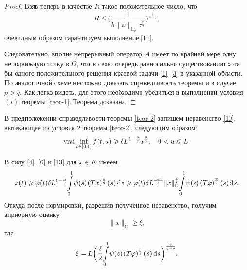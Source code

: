 \documentclass[press]{vestnik}
\begin{document}
\begin{proof}
Взяв теперь в качестве $R$ такое положительное число, что
\begin{equation}
R\leqslant \biggl(\dfrac{1}{b\|\psi\|_{\mathbb{L}_{q'}} \tau^\frac{p}{q}}\biggr)^{\frac{q}{p-q}}, \label{12}
\end{equation}
очевидным образом гарантируем выполнение \eqref{11}.

Следовательно, вполне непрерывный оператор $A$ имеет  по крайней мере одну неподвижную точку в $\Omega$, что в свою очередь равносильно существованию хотя бы одного положительного решения краевой задачи \eqref{1}--\eqref{3} в указанной области. По аналогичной схеме несложно доказать справедливость теоремы и в случае $p>q$. Как легко видеть, для этого необходимо убедиться в выполнении условия $(i)$ теоремы \ref{teor-1}. Теорема доказана.
\end{proof}

В предположении справедливости теоремы \ref{teor-2} запишем неравенство \eqref{10}, вытекающее из условия 2 теоремы \ref{teor-2}, следующим образом:
\begin{equation}
\mathop{\rm vrai}\inf_{t\in[0,1]}f(t,u)\geqslant \delta L^{1-\frac{p}{q}}u^\frac{p}{q}, \quad 0<u\leqslant L. \label{13}
\end{equation}

В силу \eqref{4}, \eqref{6} и \eqref{13} для $x\in K$ имеем
\[
x(t)\geqslant \varphi(t)\delta  L^{1-\frac{p}{q}}{\int\limits_0^1}\psi(s) \left (Tx \right)^{\frac{p}{q}}(s)\d s \geqslant \varphi(t)\delta  L^\frac{q-p}{q} \|x\|^\frac{p}{q}_{\mathbb{C}}{\int\limits_0^1} \psi(s)\left (T\varphi \right)^{\frac{p}{q}}(s)\d s.
\]
Откуда после нормировки, разрешив полученное неравенство, получим априорную оценку
\begin{equation}
\|x\|_{\mathbb{C}}\geqslant \xi, \label{14}
\end{equation}
где 
\[
\xi=L\biggl(\dfrac{\delta}{2} {\int\limits_0^1} \psi(s)\left (T\varphi \right)^{\frac{p}{q}}(s)\d s\biggr)^\frac{q}{q-p}.
\]
\end{document}
